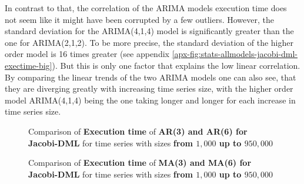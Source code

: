 In contrast to that, the correlation of the \acs{ARIMA} models execution time does not seem like it might have been corrupted by a few outliers. However, the standard deviation for the \acs{ARIMA}(4,1,4) model is significantly greater than the one for \acs{ARIMA}(2,1,2). To be more precise, the standard deviation of the higher order model is 16 times greater (see appendix \ref{apx-fig:stats-allmodels-jacobi-dml-exectime-big}).  But this is only one factor that explains the low linear correlation. By comparing the linear trends of the two \acs{ARIMA} models one can also see, that they are diverging greatly with increasing time series size, with the higher order model \acs{ARIMA}(4,1,4) being the one taking longer and longer for each increase in time series size.

\begin{figure}[!ht]
	\centering
	\caption{Comparison of \textbf{Execution time} of \textbf{AR(3) and AR(6) for Jacobi-DML} for time series with sizes \textbf{from $1,000$ up to $950,000$} }
    \label{fig:ar-comparison-jacobi}
\end{figure}

\begin{figure}[!ht]
	\centering
	\caption{Comparison of \textbf{Execution time} of \textbf{MA(3) and MA(6) for Jacobi-DML} for time series with sizes \textbf{from $1,000$ up to $950,000$} }
    \label{fig:ma-comparison-jacobi}
\end{figure}

